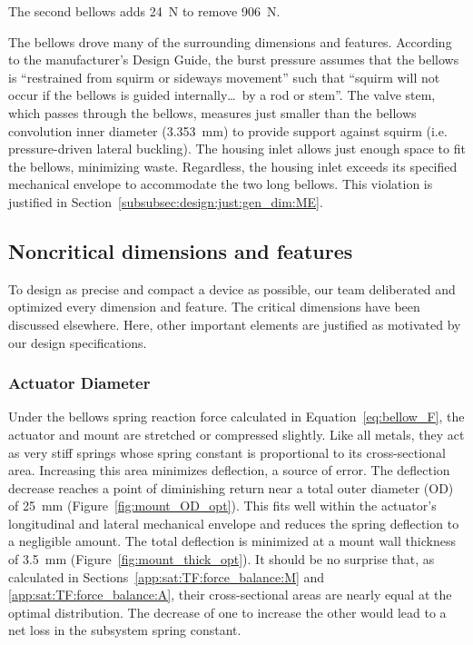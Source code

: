 \documentclass[12pt, letterpaper]{report}%
\newcounter{mycounter}           %
\newcounter{sub}[mycounter]      %
\newcommand{\specBellowsID}{\SI{3.353}{\milli \meter}} %
\begin{document}
		The second bellows adds \SI{24}{\newton} to remove \SI{906}{\newton}.

		The bellows drove many of the surrounding dimensions and features.
		According to the manufacturer's Design Guide, the burst pressure assumes that the bellows is ``restrained from squirm or sideways movement'' such that ``squirm will not occur if the bellows is guided internally\ldots\ by a rod or stem''\cite{ref_miniflex_design}.
		The valve stem, which passes through the bellows, measures just smaller than the bellows convolution inner diameter (\specBellowsID) to provide support against squirm (i.e. pressure-driven lateral buckling).
		The housing inlet allows just enough space to fit the bellows, minimizing waste. Regardless, the housing inlet exceeds its specified mechanical envelope to accommodate the two long bellows.
		This violation is justified in Section~\ref{subsubsec:design:just:gen_dim:ME}.

		\subsection{Noncritical dimensions and features}
		\label{subsec:design:just:gen_dim}

			To design as precise and compact a device as possible, our team deliberated and optimized every dimension and feature. The critical dimensions have been discussed elsewhere.
			Here, other important elements are justified as motivated by our design specifications.

			\subsubsection{Actuator Diameter}
			\label{subsubsec:design:just:gen_dim:act_diam}

				Under the bellows spring reaction force calculated in Equation~\eqref{eq:bellow_F}, the actuator and mount are stretched or compressed slightly.
				Like all metals, they act as very stiff springs whose spring constant is proportional to its cross-sectional area.
				Increasing this area minimizes deflection, a source of error.
				The deflection decrease reaches a point of diminishing return near a total outer diameter (OD) of \SI{25}{\milli\meter} (Figure~\ref{fig:mount_OD_opt}).
				This fits well within the actuator's longitudinal and lateral mechanical envelope and reduces the spring deflection to a negligible amount.
				The total deflection is minimized at a mount wall thickness of \SI{3.5}{\milli\meter} (Figure~\ref{fig:mount_thick_opt}).
				It should be no surprise that, as calculated in Sections~\ref{app:sat:TF:force_balance:M} and \ref{app:sat:TF:force_balance:A}, their cross-sectional areas are nearly equal at the optimal distribution.
				The decrease of one to increase the other would lead to a net loss in the subsystem spring constant.
\end{document}
